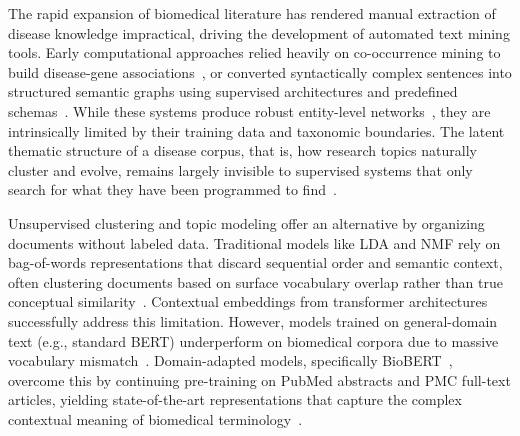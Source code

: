 \documentclass[a4paper,10pt,conference]{IEEEtran}
\begin{document}
The rapid expansion of biomedical literature has rendered manual extraction of disease knowledge impractical, driving the development of automated text mining tools. Early computational approaches relied heavily on co-occurrence mining to build disease-gene associations~\cite{ref8}, or converted syntactically complex sentences into structured semantic graphs using supervised architectures and predefined schemas~\cite{ref12,ref13}. While these systems produce robust entity-level networks~\cite{ref9,ref10}, they are intrinsically limited by their training data and taxonomic boundaries. The latent thematic structure of a disease corpus, that is, how research topics naturally cluster and evolve, remains largely invisible to supervised systems that only search for what they have been programmed to find~\cite{ref14}.

Unsupervised clustering and topic modeling offer an alternative by organizing documents without labeled data. Traditional models like LDA and NMF rely on bag-of-words representations that discard sequential order and semantic context, often clustering documents based on surface vocabulary overlap rather than true conceptual similarity~\cite{ref15}. Contextual embeddings from transformer architectures successfully address this limitation. However, models trained on general-domain text (e.g., standard BERT) underperform on biomedical corpora due to massive vocabulary mismatch~\cite{ref2,ref17}. Domain-adapted models, specifically BioBERT~\cite{ref1}, overcome this by continuing pre-training on PubMed abstracts and PMC full-text articles, yielding state-of-the-art representations that capture the complex contextual meaning of biomedical terminology~\cite{ref3,ref4,ref5,ref6,ref7}. 
\end{document}
